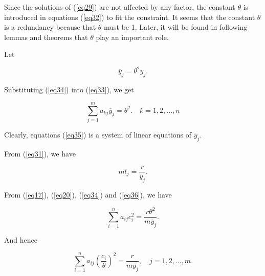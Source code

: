\documentclass [18pt]{article}
\begin{document}
Since the solutions of (\ref{eq29}) are not affected by any factor, the constant
$\theta $ is introduced in equations (\ref{eq32}) to fit the constraint. It seems
that the constant $\theta $ is a redundancy because that $\theta $ must be
1. Later, it will be found in following lemmas and theorems that $\theta $
play an important role.

Let


\begin{equation}
\label{eq34}
\overline y _j = \theta ^2y_j .
\end{equation}



Substituting (\ref{eq34}) into (\ref{eq33}), we get


\begin{equation}
\label{eq35}
\sum\limits_{j = 1}^m {a_{kj} \overline y _j = \theta ^2} .
\quad
k = 1,2,...,n
\end{equation}



Clearly, equations (\ref{eq35}) is a system of linear equations of $\overline y _j
$.

From (\ref{eq31}), we have


\begin{equation}
\label{eq36}
ml_j = \frac{r}{y_j }.
\end{equation}



From (\ref{eq17}), (\ref{eq20}), (\ref{eq34}) and (\ref{eq36}), we have


\begin{equation}
\label{eq37}
\sum\limits_{i = 1}^n {a_{ij} } c_i^2 = \frac{r\theta ^2}{m\overline y _j
}.
\end{equation}



And hence


\begin{equation}
\label{eq38}
\sum\limits_{i = 1}^n {a_{ij} (\frac{c_i }{\theta })^2} =
\frac{r}{m\overline y _j },
\quad
j = 1,2,...,m.
\end{equation}
\end{document}
